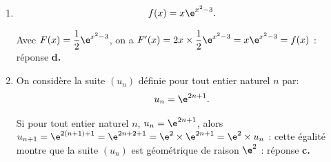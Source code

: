 
\medskip

%

\begin{enumerate}
\item %
\[f(x) = x \e^{x^2 - 3}.\]

Avec $F(x) = \dfrac12 \e^{x^2 - 3}$, on a $F'(x) = 2x \times \dfrac12\e^{x^2 - 3} = x\e^{x^2 - 3} = f(x)$ : réponse \textbf{d.~}

\item On considère la suite $\left(u_n\right)$ définie pour tout entier naturel $n$ par: \[u_n = \e^{2n+1}.\]

%
Si pour tout entier naturel $n$, \: $u_n = \e^{2n+1}$, alors $u_{n+1} = \e^{2(n+1)+ 1} = \e^{2n + 2 + 1} = \e^{2} \times \e^{2n + 1} = \e^{2} \times u_n$ : cette égalité montre que la suite $\left(u_n\right)$ est géométrique de raison $\e^{2}$ : réponse \textbf{c.~~}


\end{enumerate}
